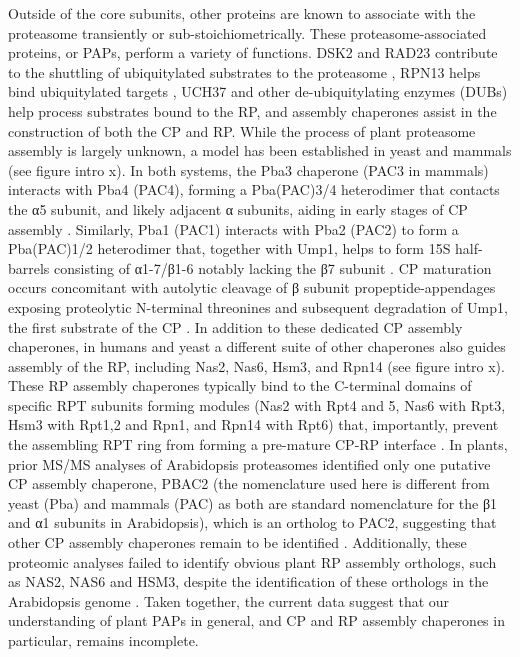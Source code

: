 	Outside of the core subunits, other proteins are known to associate with the proteasome transiently or sub-stoichiometrically. These proteasome-associated proteins, or PAPs, perform a variety of functions. DSK2 and RAD23 contribute to the shuttling of ubiquitylated substrates to the proteasome \citep{farmer10, fatimababy10, lin11}, RPN13 helps bind ubiquitylated targets \citep{schreiner08}, UCH37 and other de-ubiquitylating enzymes (DUBs) \citep{vanderlinden15} help process substrates bound to the RP, and assembly chaperones assist in the construction of both the CP and RP.  While the process of plant proteasome assembly is largely unknown, a model has been established in yeast and mammals (see figure intro x). In both systems, the Pba3 chaperone (PAC3 in mammals) interacts with Pba4 (PAC4), forming a Pba(PAC)3/4 heterodimer that contacts the α5 subunit, and likely adjacent α subunits, aiding in early stages of CP assembly \citep{kunjappu14, yashiroda08}. Similarly, Pba1 (PAC1) interacts with Pba2 (PAC2) to form a Pba(PAC)1/2 heterodimer that, together with Ump1, helps to form 15S half-barrels consisting of α1-7/β1-6 notably lacking the β7 subunit \citep{kunjappu14, marques07}. CP maturation occurs concomitant with autolytic cleavage of β subunit propeptide-appendages exposing proteolytic N-terminal threonines and subsequent degradation of Ump1, the first substrate of the CP \citep{ramos98}. In addition to these dedicated CP assembly chaperones, in humans and yeast a different suite of other chaperones also guides assembly of the RP, including Nas2, Nas6, Hsm3, and Rpn14 (see figure intro x). These RP assembly chaperones typically bind to the C-terminal domains of specific RPT subunits forming modules (Nas2 with Rpt4 and 5, Nas6 with Rpt3, Hsm3 with Rpt1,2 and Rpn1, and Rpn14 with Rpt6) that, importantly, prevent the assembling RPT ring from forming a pre-mature CP-RP interface \citep{park10}.  In plants, prior MS/MS analyses of Arabidopsis proteasomes identified only one putative CP assembly chaperone, PBAC2 (the nomenclature used here is different from yeast (Pba) and mammals (PAC) as both are standard nomenclature for the β1 and α1 subunits in Arabidopsis), which is an ortholog to PAC2, suggesting that other CP assembly chaperones remain to be identified \citep{book10}.  Additionally, these proteomic analyses failed to identify obvious plant RP assembly orthologs, such as NAS2, NAS6 and HSM3, despite the identification of these orthologs in the Arabidopsis genome \citep{book10}. Taken together, the current data suggest that our understanding of plant PAPs in general, and CP and RP assembly chaperones in particular, remains incomplete.
	

